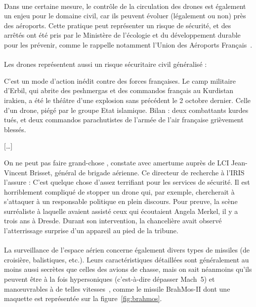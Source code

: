 	\paragraph{}
	Dans une certaine mesure, le contrôle de la circulation des drones est également un enjeu pour le domaine civil, car ils peuvent évoluer (légalement ou non) près des aéroports. Cette pratique peut représenter un risque de sécurité, et des arrêtés ont été pris par le Ministère de l'écologie et du développement durable pour les prévenir, comme le rappelle notamment l'Union des Aéroports Français~\cite{dronesuaf}.
	
	\paragraph{}
	Les drones représentent aussi un risque sécuritaire civil généralisé :
	
	\begin{displayquote}
	C'est un mode d'action inédit contre des forces françaises. Le camp militaire d'Erbil, qui abrite des peshmergas et des commandos français au Kurdistan irakien, a été le théâtre d'une explosion sans précédent le 2 octobre dernier. Celle d'un drone, piégé par le groupe Etat islamique. Bilan : deux combattants kurdes tués, et deux commandos parachutistes de l'armée de l'air française grièvement blessés.
	
	[\ldots{}]
	
	\og On ne peut pas faire grand-chose \fg{}, constate avec amertume auprès de LCI Jean-Vincent Brisset, général de brigade aérienne. Ce directeur de recherche à l’IRIS l'assure : \og C'est quelque chose d'assez terrifiant pour les services de sécurité. Il est horriblement compliqué de stopper un drone qui, par exemple, chercherait à s'attaquer à un responsable politique en plein discours. \fg{} Pour preuve, la scène surréaliste à laquelle avaient assisté ceux qui écoutaient Angela Merkel, il y a trois ans à Dresde. Durant son intervention, la chancelière avait observé l’atterrissage surprise d’un appareil au pied de la tribune.~\cite{brisset}

	
	\end{displayquote}
	
	\paragraph{}
	La surveillance de l'espace aérien concerne également divers types de missiles (de croisière, balistiques, etc.). Leurs caractéristiques détaillées sont généralement au moins aussi secrètes que celles des avions de chasse, mais on sait néanmoins qu'ils peuvent être à la fois hypersoniques (c'est-à-dire dépasser Mach~5) et manœuvrables à de telles vitesses~\cite{missiles}, comme le missile BrahMos-II dont une maquette est représentée sur la figure~\ref{fig:brahmos}.
	
